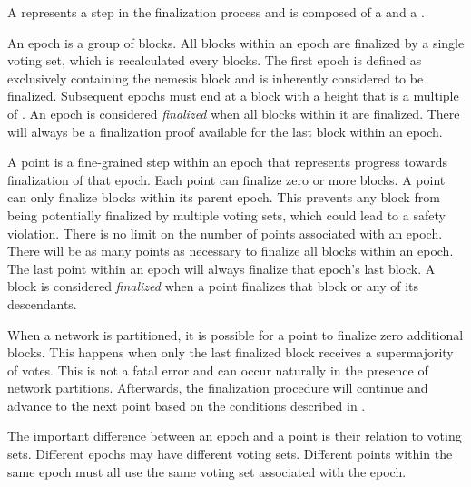 A  represents a step in the finalization process and is composed of a  and a .

An epoch is a group of blocks.
All blocks within an epoch are finalized by a single voting set, which is recalculated every  blocks.
The first epoch is defined as exclusively containing the nemesis block and is inherently considered to be finalized.
Subsequent epochs must end at a block with a height that is a multiple of .
An epoch is considered \emph{finalized} when all blocks within it are finalized.
There will always be a finalization proof available for the last block within an epoch.

A point is a fine-grained step within an epoch that represents progress towards finalization of that epoch.
Each point can finalize zero or more blocks.
A point can only finalize blocks within its parent epoch.
This prevents any block from being potentially finalized by multiple voting sets, which could lead to a safety violation.
There is no limit on the number of points associated with an epoch.
There will be as many points as necessary to finalize all blocks within an epoch.
The last point within an epoch will always finalize that epoch's last block.
A block is considered \emph{finalized} when a point finalizes that block or any of its descendants.

When a network is partitioned, it is possible for a point to finalize zero additional blocks.
This happens when only the last finalized block receives a supermajority of votes.
This is not a fatal error and can occur naturally in the presence of network partitions.
Afterwards, the finalization procedure will continue and advance to the next point based on the conditions described in .

The important difference between an epoch and a point is their relation to voting sets.
Different epochs may have different voting sets.
Different points within the same epoch must all use the same voting set associated with the epoch.

